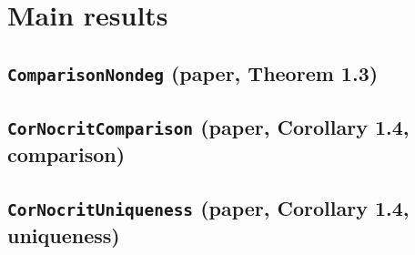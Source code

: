 \documentclass[11pt]{amsart}
\theoremstyle{definition}
\begin{document}
\section{Main results}\label{sec:main}
\subsection{\texorpdfstring{\texttt{ComparisonNondeg} (paper, Theorem 1.3)}{ComparisonNondeg}}\label{node:ComparisonNondeg}


\subsection{\texorpdfstring{\texttt{CorNocritComparison} (paper, Corollary 1.4, comparison)}{CorNocritComparison}}\label{node:CorNocritComparison}


\subsection{\texorpdfstring{\texttt{CorNocritUniqueness} (paper, Corollary 1.4, uniqueness)}{CorNocritUniqueness}}\label{node:CorNocritUniqueness}

\end{document}
